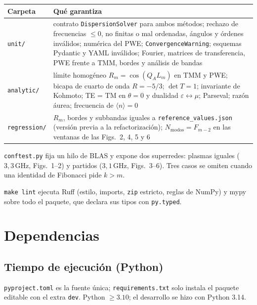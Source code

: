 \documentclass[11pt,a4paper]{article}
\begin{document}
\begin{center}
\begin{tabular}{lp{9cm}}
\toprule
Carpeta & Qué garantiza \\
\midrule
\texttt{unit/} & contrato \texttt{DispersionSolver} para ambos métodos; rechazo de frecuencias \(\le 0\), no finitas o mal ordenadas, ángulos y órdenes inválidos; numérica del PWE; \texttt{ConvergenceWarning}; esquemas Pydantic y YAML inválidos; Fourier, matrices de transferencia, PWE frente a TMM, bordes y análisis de bandas \\
\texttt{analytic/} & límite homogéneo \(R_m=\cos(Q_A L_m)\) en TMM y PWE; bicapa de cuarto de onda \(R=-5/3\); \(\det T=1\); invariante de Kohmoto; TE = TM en \(\theta=0\) y dualidad \(\varepsilon\leftrightarrow\mu\); Parseval; razón áurea; frecuencia de \(\langle n\rangle=0\) \\
\texttt{regression/} & \(R_m\), bordes y subbandas iguales a \texttt{reference\_values.json} (versión previa a la refactorización); \(N_{\mathrm{modos}}=F_{m-2}\) en las ventanas de las Figs.~2, 4, 5 y 6 \\
\bottomrule
\end{tabular}
\end{center}

\texttt{conftest.py} fija un hilo de BLAS y expone dos superredes:
plasmas iguales (\(3,3\,\mathrm{GHz}\), Figs.~1--2) y partidos
(\(3,1\,\mathrm{GHz}\), Figs.~3--6). Tres casos se omiten cuando una identidad
de Fibonacci pide \(k>m\).

\texttt{make lint} ejecuta Ruff (estilo, imports, \texttt{zip} estricto,
reglas de NumPy) y mypy sobre todo el paquete, que declara sus tipos con
\texttt{py.typed}.

\section{Dependencias}

\subsection{Tiempo de ejecución (Python)}

\texttt{pyproject.toml} es la fuente única; \texttt{requirements.txt} solo
instala el paquete editable con el extra \texttt{dev}. Python \(\ge 3.10\);
el desarrollo se hizo con Python 3.14.
\end{document}
